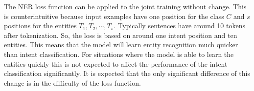 The NER loss function can be applied to the joint training without change.
This is counterintuitive because input examples have one position for the class $C$ and $s$ positions for the entities $T_1, T_2, \cdots, T_s$.
Typically sentences have around 10 tokens after tokenization.
So, the loss is based on around one intent position and ten entities.
This means that the model will learn entity recognition much quicker than intent classification.
For situations where the model is able to learn the entities quickly this is not expected to affect the performance of the intent classification significantly.
It is expected that the only significant difference of this change is in the difficulty of the loss function.
